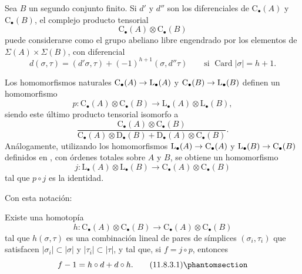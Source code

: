 \documentclass[oneside]{amsart}
\makeatletter
\newcommand{\ega@arrow}[2]{\mathchoice{#1}{#2}{#2}{#2}}
\renewcommand{\to}{\ega@arrow{\longrightarrow}{\rightarrow}}
\newcommand{\oldpage}[2][]{{\marginnote{\normalfont\textbf{#1}~|~#2}}\ignorespaces}
\let\EGAOriginalLabel\label
\renewcommand{\label}[1]{\phantomsection\EGAOriginalLabel{#1}}
\makeatother
\begin{document}
\begin{env}[11.8.2]
\label{0.11.8.2}
Sea $B$ un segundo conjunto finito.
Si $d'$ y $d''$ son los diferenciales de
$\mathrm{C}_\bullet(A)$ y $\mathrm{C}_\bullet(B)$, el complejo producto
tensorial
\[
  \mathrm{C}_\bullet(A)\otimes\mathrm{C}_\bullet(B)
\]
puede considerarse como el grupo abeliano libre engendrado por los elementos de
$\Sigma(A)\times\Sigma(B)$, con diferencial
\[
  d(\sigma,\tau)
  =
  (d'\sigma,\tau)+(-1)^{h+1}(\sigma,d''\tau)
  \qquad\text{si }\operatorname{Card}|\sigma|=h+1.
\]

Los homomorfismos naturales
$\mathrm{C}_\bullet(A)\to\mathrm{L}_\bullet(A)$ y
$\mathrm{C}_\bullet(B)\to\mathrm{L}_\bullet(B)$ definen un homomorfismo
\[
  p:
  \mathrm{C}_\bullet(A)\otimes\mathrm{C}_\bullet(B)
  \longrightarrow
  \mathrm{L}_\bullet(A)\otimes\mathrm{L}_\bullet(B),
\]
siendo este último producto tensorial isomorfo a
\[
  \frac{\mathrm{C}_\bullet(A)\otimes\mathrm{C}_\bullet(B)}
  {\mathrm{C}_\bullet(A)\otimes\mathrm{D}_\bullet(B)
   +\mathrm{D}_\bullet(A)\otimes\mathrm{C}_\bullet(B)}.
\]
Análogamente, utilizando los homomorfismos
$\mathrm{L}_\bullet(A)\to\mathrm{C}_\bullet(A)$ y
$\mathrm{L}_\bullet(B)\to\mathrm{C}_\bullet(B)$ definidos en
, con órdenes totales sobre $A$ y $B$, se obtiene un
homomorfismo
\[
  j:
  \mathrm{L}_\bullet(A)\otimes\mathrm{L}_\bullet(B)
  \longrightarrow
  \mathrm{C}_\bullet(A)\otimes\mathrm{C}_\bullet(B)
\]
tal que $p\circ j$ es la identidad.
\end{env}

\oldpage[0\textsubscript{III}]{44}
Con esta notación:
\begin{proposition}[11.8.3]
\label{0.11.8.3}
Existe una homotopía
\[
  h:
  \mathrm{C}_\bullet(A)\otimes\mathrm{C}_\bullet(B)
  \longrightarrow
  \mathrm{C}_\bullet(A)\otimes\mathrm{C}_\bullet(B)
\]
tal que $h(\sigma,\tau)$ es una combinación lineal de pares de símplices
$(\sigma_i,\tau_i)$ que satisfacen
$|\sigma_i|\subset|\sigma|$ y $|\tau_i|\subset|\tau|$, y tal que,
si $f=j\circ p$, entonces
\[
  f-1=h\circ d+d\circ h.
  \tag{11.8.3.1}\label{0.11.8.3.1}
\]
\end{proposition}
\end{document}

